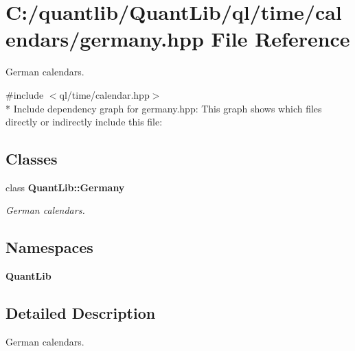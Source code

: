 \section{C\+:/quantlib/\+Quant\+Lib/ql/time/calendars/germany.hpp File Reference}
\label{germany_8hpp}


German calendars.  


{\ttfamily \#include $<$ql/time/calendar.\+hpp$>$}\\*
Include dependency graph for germany.\+hpp\+:
This graph shows which files directly or indirectly include this file\+:
\subsection*{Classes}
\begin{DoxyCompactItemize}
\item 
class {\bf Quant\+Lib\+::\+Germany}
\begin{DoxyCompactList}\small\item\em German calendars. \end{DoxyCompactList}\end{DoxyCompactItemize}
\subsection*{Namespaces}
\begin{DoxyCompactItemize}
\item 
 {\bf Quant\+Lib}
\end{DoxyCompactItemize}


\subsection{Detailed Description}
German calendars. 

